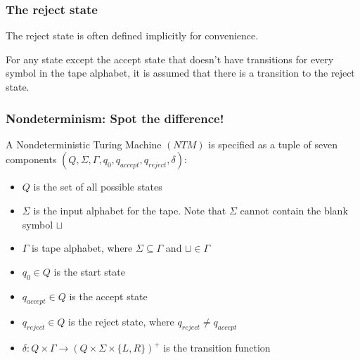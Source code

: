 \documentclass[aspectratio=169]{beamer}
\begin{document}
\begin{frame}[noframenumbering]
\frametitle{The reject state}

The reject state is often defined implicitly for convenience.

For any state except the accept state that doesn't have transitions for every symbol in the tape alphabet, it is assumed that there is a transition to the reject state.

\begin{center}
\end{center}
\end{frame}

\begin{frame}
\frametitle{Nondeterminism: Spot the difference!}
A Nondeterministic Turing Machine $(NTM)$ is specified as a tuple of seven components $(Q, \Sigma, \Gamma, q_0, q_{accept}, q_{reject}, \delta)$:

\begin{itemize}
    \item<1-> $Q$ is the set of all possible states
    \item<2-> $\Sigma$ is the input alphabet for the tape. Note that $\Sigma$ cannot contain the blank symbol $\sqcup$
    \item<3-> $\Gamma$ is tape alphabet, where $\Sigma \subseteq \Gamma$ and $\sqcup \in \Gamma$
    \item<4-> $q_0 \in Q$ is the start state
    \item<5-> $q_{accept} \in Q$ is the accept state
    \item<6-> $q_{reject} \in Q$ is the reject state, where $q_{reject} \neq q_{accept}$
    \item<7-> $\delta: Q \times \Gamma \to (Q \times \Sigma \times \{L, R\})^+$ is the transition function
\end{itemize}
\end{frame}
\end{document}
